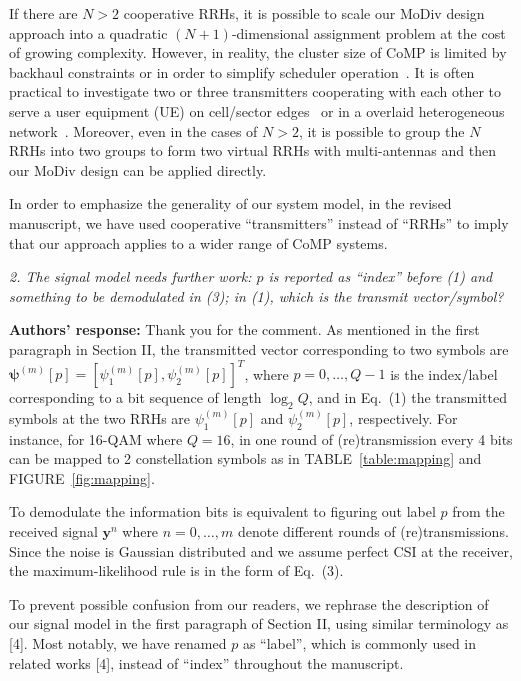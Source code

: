 \documentclass[onecolumn, 11pt, draftclsnofoot]{IEEEtran}
\begin{document}
If there are $N>2$ cooperative RRHs, it is possible to
scale our MoDiv design approach into a quadratic $(N+1)$-dimensional
assignment problem at the cost of growing complexity. However, in reality,
the cluster size of CoMP is limited by backhaul constraints or in order to
simplify scheduler operation~\citep[R][]{6146494}. It is often
practical to investigate two or three transmitters cooperating
with each other to serve a user equipment (UE) on cell/sector
edges~\citep[R][]{4385782, 5463229, 5456455} or in a overlaid heterogeneous
network~\citep[R][]{6879305, 6362916}. Moreover, even in the cases of $N>2$, it
is possible to group the $N$ RRHs into two groups to form two virtual RRHs with
multi-antennas and then our MoDiv design can be applied directly.

In order to emphasize the generality of our system model, in the revised
manuscript, we have used cooperative ``transmitters'' instead of ``RRHs'' to
imply that our approach applies to a wider range of CoMP systems.

\vspace{0.5cm}

\noindent
\emph{2. The signal model needs further work: $p$ is reported as “index” before
(1) and something to be demodulated in (3); in (1), which is the transmit
vector/symbol? }

\noindent \textbf{Authors' response:}
Thank you for the comment. As mentioned in the first paragraph in Section
II, the transmitted vector corresponding to two symbols are
$\bm{\psi}^{(m)}[p] = [\psi_1^{(m)}[p], \psi_2^{(m)}[p]]^T$, where
$p=0,\ldots,Q-1$ is the index/label corresponding to a bit sequence of length
$\log_2Q$, and in Eq.~(1) the transmitted symbols at the two RRHs are
$\psi_1^{(m)}[p]$ and $\psi_2^{(m)}[p]$, respectively. For instance, for 16-QAM where $Q=16$, in
one round of (re)transmission every 4 bits can be mapped to 2 constellation
symbols as in TABLE~\ref{table:mapping} and FIGURE~\ref{fig:mapping}.

To demodulate the information bits is equivalent to figuring out label $p$ from
the received signal $\mathbf{y}^{n}$ where $n=0,\ldots,m$ denote different
rounds of (re)transmissions. Since the noise is Gaussian distributed and we
assume perfect CSI at the receiver, the maximum-likelihood rule is in the form
of Eq.~(3).

To prevent possible confusion from our readers, we rephrase the description of
our signal model in the first paragraph of Section II, using similar
terminology as [4]. Most notably, we have renamed $p$ as ``label'', which is
commonly used in related works [4]\citep[R][]{1388738, 7494668}, instead of
``index'' throughout the manuscript.
\end{document}
